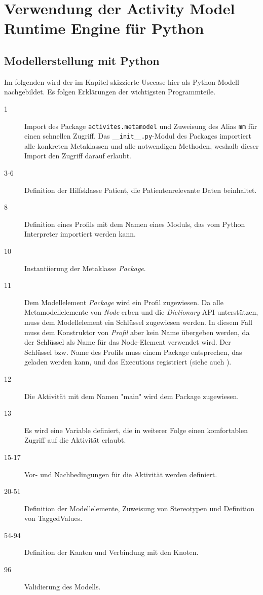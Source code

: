 \chapter{Verwendung der Activity Model Runtime Engine für Python}\label{amrep-use}

\section{Modellerstellung mit Python}
Im folgenden wird der im Kapitel  skizzierte Usecase hier als Python Modell nachgebildet. Es folgen Erklärungen der wichtigsten Programmteile.



\begin{description}
\item[1] Import des Package \texttt{activites.metamodel} und Zuweisung des Alias \texttt{mm} für einen schnellen Zugriff. Das \texttt{\_\_init\_\_.py}-Modul des Packages importiert alle konkreten Metaklassen und alle notwendigen Methoden, weshalb dieser Import den Zugriff darauf erlaubt.
\item[3-6] Definition der Hilfsklasse Patient, die Patientenrelevante Daten beinhaltet.
\item[8] Definition eines Profils mit dem Namen eines Moduls, das vom Python Interpreter importiert werden kann.
\item[10] Instantiierung der Metaklasse \emph{Package}.
\item[11] Dem Modellelement \emph{Package} wird ein Profil zugewiesen. Da alle Metamodellelemente von \emph{Node} erben und die \emph{Dictionary}-API unterstützen, muss dem Modellelement ein Schlüssel zugewiesen werden. In diesem Fall muss dem Konstruktor von \emph{Profil} aber kein Name übergeben werden, da der Schlüssel als Name für das Node-Element verwendet wird. Der Schlüssel bzw. Name des Profils muss einem Package entsprechen, das geladen werden kann, und das Executions registriert (siehe auch ).
\item[12] Die Aktivität mit dem Namen "main" wird dem Package zugewiesen.
\item[13] Es wird eine Variable definiert, die in weiterer Folge einen komfortablen Zugriff auf die Aktivität erlaubt.
\item[15-17] Vor- und Nachbedingungen für die Aktivität werden definiert.
\item[20-51] Definition der Modellelemente, Zuweisung von Stereotypen und Definition von TaggedValues.
\item[54-94] Definition der Kanten und Verbindung mit den Knoten.
\item[96] Validierung des Modells.
\end{description}


